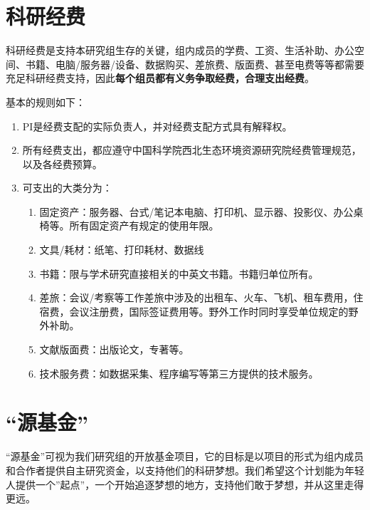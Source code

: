 \documentclass[
]{ctexbook}
\providecommand{\tightlist}{%
  \setlength{\itemsep}{0pt}\setlength{\parskip}{0pt}}
\begin{document}
\hypertarget{ux79d1ux7814ux7ecfux8d39}{%
\section{科研经费}\label{ux79d1ux7814ux7ecfux8d39}}

科研经费是支持本研究组生存的关键，组内成员的学费、工资、生活补助、办公空间、书籍、电脑/服务器/设备、数据购买、差旅费、版面费、甚至电费等等都需要充足科研经费支持，因此\textbf{每个组员都有义务争取经费，合理支出经费}。

基本的规则如下：

\begin{enumerate}
\def\labelenumi{\arabic{enumi}.}
\tightlist
\item
  PI是经费支配的实际负责人，并对经费支配方式具有解释权。
\item
  所有经费支出，都应遵守中国科学院西北生态环境资源研究院经费管理规范，以及各经费预算。
\item
  可支出的大类分为：

  \begin{enumerate}
  \def\labelenumii{\arabic{enumii}.}
  \tightlist
  \item
    固定资产：服务器、台式/笔记本电脑、打印机、显示器、投影仪、办公桌椅等。所有固定资产有规定的使用年限。
  \item
    文具/耗材：纸笔、打印耗材、数据线
  \item
    书籍：限与学术研究直接相关的中英文书籍。书籍归单位所有。
  \item
    差旅：会议/考察等工作差旅中涉及的出租车、火车、飞机、租车费用，住宿费，会议注册费，国际签证费用等。野外工作时同时享受单位规定的野外补助。
  \item
    文献版面费：出版论文，专著等。
  \item
    技术服务费：如数据采集、程序编写等第三方提供的技术服务。
  \end{enumerate}
\end{enumerate}

\hypertarget{ux6e90ux57faux91d1}{%
\section{``源基金''}\label{ux6e90ux57faux91d1}}

``源基金''可视为我们研究组的开放基金项目，它的目标是以项目的形式为组内成员和合作者提供自主研究资金，以支持他们的科研梦想。我们希望这个计划能为年轻人提供一个''起点''，一个开始追逐梦想的地方，支持他们敢于梦想，并从这里走得更远。
\end{document}
